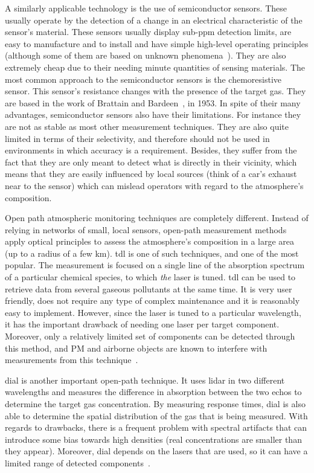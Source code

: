 A similarly applicable technology is the use of semiconductor sensors.
These usually operate by the detection of a change in an electrical
characteristic of the sensor's material. These sensors usually display
sub-ppm detection limits, are easy to manufacture and to install and
have simple high-level operating principles (although some of them are
based on unknown phenomena~\cite{Dhall2021}). They are
also extremely cheap due to their needing minute quantities of sensing
materials. The most common approach to the semiconductor sensors is the
chemoresistive sensor. This sensor's resistance changes with the
presence of the target gas. They are based in the work of Brattain and
Bardeen~\cite{Dhall2021, Brattain1952}, in 1953. In spite of their many
advantages, semiconductor sensors also have their limitations. For
instance they are not as stable as most other measurement techniques.
They are also quite limited in terms of their selectivity, and therefore
should not be used in environments in which accuracy is a requirement.
Besides, they suffer from the fact that they are only meant to detect
what is directly in their vicinity, which means that they are easily
influenced by local sources (think of a car's exhaust near to the
sensor) which can mislead operators with regard to the atmosphere's
composition.

Open path atmospheric monitoring techniques are completely different.
Instead of relying in networks of small, local sensors, open-path
measurement methods apply optical principles to assess the atmosphere's
composition in a large area (up to a radius of a few km). \gls{tdl} is
one of such techniques, and one of the most popular. The measurement is
focused on a single line of the absorption spectrum of a particular
chemical species, to which \emph{the} laser is tuned. \gls{tdl} can be
used to retrieve data from several gaseous pollutants at the same time.
It is very user friendly, does not require any type of complex
maintenance and it is reasonably easy to implement. However, since the
laser is tuned to a particular wavelength, it has the important drawback
of needing one laser per target component. Moreover, only a relatively
limited set of components can be detected through this method, and
\gls{PM} and airborne objects are known to interfere with measurements
from this technique~\cite{Vallero2014, Kim2007}.

\gls{dial} is another important open-path technique. It uses \gls{lidar}
in two different wavelengths and measures the difference in absorption
between the two echos to determine the target gas concentration. By
measuring response times, \gls{dial} is also able to determine the
spatial distribution of the gas that is being measured. With regards to
drawbacks, there is a frequent problem with spectral artifacts that can
introduce some bias towards high densities (real concentrations are
smaller than they appear). Moreover, \gls{dial} depends on the lasers
that are used, so it can have a limited range of detected
components~\cite{Vallero2014}.

